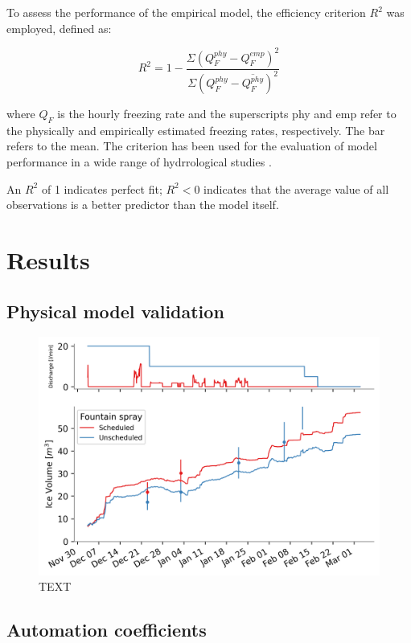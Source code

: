 \documentclass[tc, manuscript]{copernicus}
\begin{document}
 To assess the performance of the empirical model, the efficiency criterion $R^2$ \citep{nashRiverFlowForecasting1970} was employed, defined as:

\begin{equation}
  R^2 = 1 - \frac{\Sigma(Q^{phy}_{F} - Q^{emp}_{F})^2}{\Sigma(Q^{phy}_{F} - \overline{{Q^{phy}_{F}}})^2}
\end{equation}

where $Q_{F}$ is the hourly freezing rate and the superscripts phy and emp refer to the physically and
empirically estimated freezing rates, respectively. The bar refers to the mean. The criterion has been used for
the evaluation of model performance in a wide range of hydrrological studies
\citep[e.g.,][]{wilcoxPredictingRunoffRangeland1990}.

An $R^2$ of 1 indicates perfect fit; $R^2<0$ indicates that the average value of all observations is a better
predictor than the model itself. 

\section{Results}

\subsection{Physical model validation}

\begin{figure}[t]
\includegraphics[width=12cm]{Figures/autovsman.png}
\caption{TEXT}
\end{figure}

\subsection{Automation coefficients}
\end{document}
